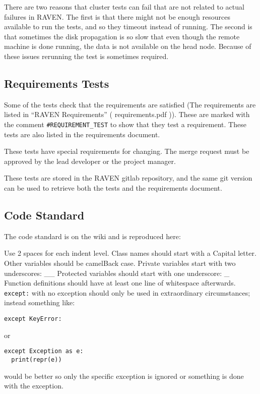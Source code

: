 \documentclass{article}
\begin{document}
There are two reasons that cluster tests can fail that are not related
to actual failures in RAVEN.  The first is that there might not be
enough resources available to run the tests, and so they timeout
instead of running.  The second is that sometimes the disk propagation
is so slow that even though the remote machine is done running, the
data is not available on the head node.  Because of these issues
rerunning the test is sometimes required.

\subsection{Requirements Tests}

Some of the tests check that the requirements are satisfied (The
requirements are listed in ``RAVEN Requirements'' ( requirements.pdf
)).  These are marked with the comment \verb'#REQUIREMENT_TEST' to show
that they test a requirement.  These tests are also listed in the
requirements document.

These tests have special requirements for changing.  The merge request
must be approved by the lead developer or the project manager.

These tests are stored in the RAVEN gitlab repository, and the same
git version can be used to retrieve both the tests and the
requirements document.

\subsection{Code Standard}
\label{code_standard}

The code standard is on the wiki and is reproduced here:

Use 2 spaces for each indent level. Class names should start with a
Capital letter. Other variables should be camelBack case. Private
variables start with two underscores: \_\_ Protected variables should
start with one underscore: \_ Function definitions should have at least
one line of whitespace afterwards. \verb'except:' with no exception should
only be used in extraordinary circumstances; instead something like:
\begin{verbatim}
except KeyError:
\end{verbatim}
or
\begin{verbatim}
except Exception as e:
  print(repr(e))
\end{verbatim}
would be better so only the specific exception is ignored or something
is done with the exception.
\end{document}
